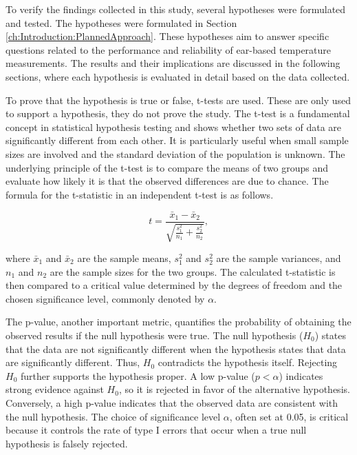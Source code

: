 To verify the findings collected in this study, several hypotheses were formulated and tested.
The hypotheses were formulated in Section \ref{ch:Introduction:PlannedApproach}.
These hypotheses aim to answer specific questions related to the performance and reliability of ear-based temperature measurements. 
The results and their implications are discussed in the following sections, where each hypothesis is evaluated in detail based on the data collected.

To prove that the hypothesis is true or false, t-tests are used.
These are only used to support a hypothesis, they do not prove the study.
The t-test is a fundamental concept in statistical hypothesis testing and shows whether two sets of data are significantly different from each other. 
It is particularly useful when small sample sizes are involved and the standard deviation of the population is unknown.
The underlying principle of the t-test is to compare the means of two groups and evaluate how likely it is that the observed differences are due to chance.
The formula for the t-statistic in an independent t-test is as follows.

\[
t = \frac{{\bar{x}_1 - \bar{x}_2}}{\sqrt{\frac{{s_1^2}}{n_1} + \frac{{s_2^2}}{n_2}}},
\]

where \( \bar{x}_1 \) and \( \bar{x}_2 \) are the sample means, \( s_1^2 \) and \( s_2^2 \) are the sample variances, and \( n_1 \) and \( n_2 \) are the sample sizes for the two groups.
The calculated t-statistic is then compared to a critical value determined by the degrees of freedom and the chosen significance level, commonly denoted by \( \alpha \).

The p-value, another important metric, quantifies the probability of obtaining the observed results if the null hypothesis were true.
The null hypothesis ($H_0$) states that the data are not significantly different when the hypothesis states that data are significantly different.
Thus, $H_0$ contradicts the hypothesis itself.
Rejecting $H_0$ further supports the hypothesis proper.
A low p-value (\( p < \alpha \)) indicates strong evidence against $H_0$, so it is rejected in favor of the alternative hypothesis.
Conversely, a high p-value indicates that the observed data are consistent with the null hypothesis.
The choice of significance level \( \alpha \), often set at 0.05, is critical because it controls the rate of type I errors that occur when a true null hypothesis is falsely rejected.

